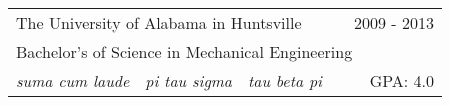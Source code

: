 \documentclass[10pt,a4paper]{article}
\begin{document}
\noindent\begin{tabularx}{\textwidth}{cccXr}
  \multicolumn{3}{l}{The University of Alabama in Huntsville} & & 2009 - 2013 \\
  \multicolumn{5}{l}{\hspace{.125in} Bachelor's of Science in Mechanical Engineering} \\
  \hspace{.125in} \textit{suma cum laude} & \textit{pi tau sigma} & \textit{tau beta pi}  & & GPA: 4.0 \\
\end{tabularx}
\bigskip
\end{document}
